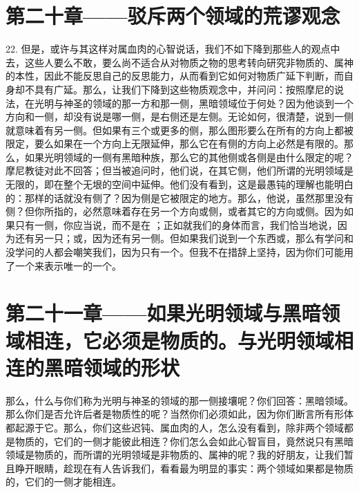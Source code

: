 
\section{第二十章——驳斥两个领域的荒谬观念}

22. 但是，或许与其这样对属血肉的心智说话，我们不如下降到那些人的观点中去，这些人要么不敢，要么尚不适合从对物质之物的思考转向研究非物质的、属神的本性，因此不能反思自己的反思能力，从而看到它如何对物质广延下判断，而自身却不具有广延。那么，让我们下降到这些物质观念中，并问问：按照摩尼的说法，在光明与神圣的领域的那一方和那一侧，黑暗领域位于何处？因为他谈到一个方向和一侧，却没有说是哪一侧，是右侧还是左侧。无论如何，很清楚，说到一侧就意味着有另一侧。但如果有三个或更多的侧，那么图形要么在所有的方向上都被限定，要么如果在一个方向上无限延伸，那么它在有侧的方向上必然是有限的。那么，如果光明领域的一侧有黑暗种族，那么它的其他侧或各侧是由什么限定的呢？摩尼教徒对此不回答；但当被追问时，他们说，在其它侧，他们所谓的光明领域是无限的，即在整个无垠的空间中延伸。他们没有看到，这是最愚钝的理解也能明白的：那样的话就没有侧了？因为侧是它被限定的地方。那么，他说，虽然那里没有侧？但你所指的，必然意味着存在另一个方向或侧，或者其它的方向或侧。因为如果只有一侧，你应当说，而不是在 ；正如就我们的身体而言，我们恰当地说，因为还有另一只；或，因为还有另一侧。但如果我们说到一个东西或，那么有学问和没学问的人都会嘲笑我们，因为只有一个。但我不在措辞上坚持，因为你们可能用了一个来表示唯一的一个。\par


\section{第二十一章——如果光明领域与黑暗领域相连，它必须是物质的。与光明领域相连的黑暗领域的形状}

那么，什么与你们称为光明与神圣的领域的那一侧接壤呢？你们回答：黑暗领域。那么你们是否允许后者是物质性的呢？当然你们必须如此，因为你们断言所有形体都起源于它。那么，你们这些迟钝、属血肉的人，怎么没有看到，除非两个领域都是物质的，它们的一侧才能彼此相连？你们怎么会如此心智盲目，竟然说只有黑暗领域是物质的，而所谓的光明领域是非物质的、属神的呢？我的好朋友，让我们暂且睁开眼睛，趁现在有人告诉我们，看看最为明显的事实：两个领域如果都是物质的，它们的一侧才能相连。\par

